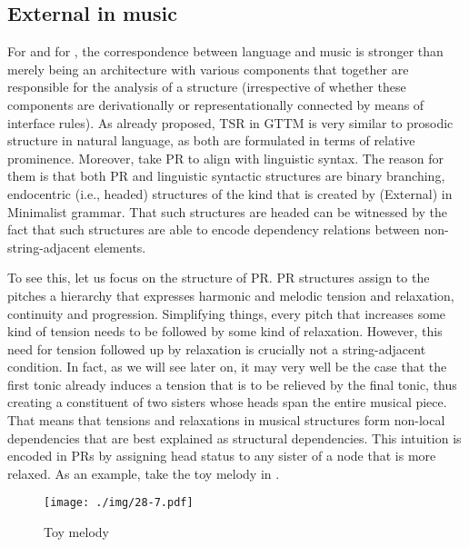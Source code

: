 \documentclass[output=paper]{langsci/langscibook}
\begin{document}
\subsection{External  in music}\label{sec:26.3.2}

For \citeauthor{LerJac1983} and for \citeauthor{KatzPes2011}, the
correspondence between language and music is stronger than merely being an
architecture with various components that together are responsible for the
analysis of a structure (irrespective of whether these components are
derivationally or representationally connected by means of interface rules). As
\citeauthor{LerJac1983} already proposed, \gls{TSR} in \gls{GTTM} is very similar to prosodic structure in natural
language, as both are formulated in terms of relative prominence. Moreover,
\citeauthor{KatzPes2011} take \gls{PR} to align with linguistic syntax.  The
reason for them is that both \gls{PR} and linguistic syntactic structures are
binary branching, endocentric (i.e., headed) structures of the kind that is
created by (External)  in Minimalist grammar. That such structures
are headed can be witnessed by the fact that such structures are able to encode
dependency relations between non-string-adjacent elements.

To see this, let us focus on the structure of \gls{PR}. \gls{PR} structures
assign to the pitches a hierarchy that expresses harmonic and melodic tension
and relaxation, continuity and progression. Simplifying things, every pitch
that increases some kind of tension needs to be followed by some kind of
relaxation. However, this need for tension followed up by relaxation is
crucially not a string-adjacent condition. In fact, as we will see later on, it
may very well be the case that the first tonic already induces a tension that
is to be relieved by the final tonic, thus creating a constituent of two
sisters whose heads span the entire musical piece. That means that tensions and
relaxations in musical structures form non-local dependencies that are best
explained as structural dependencies.  This intuition is encoded in \glspl{PR}
by assigning head status to any sister of a node that is more relaxed.
As an example, take the toy melody in .

\begin{figure}
\caption{\label{bkm:Ref348696475}Toy melody
\parencite[16]{KatzPes2011}}
\texttt{[image: ./img/28-7.pdf]}
\end{figure}
\end{document}
